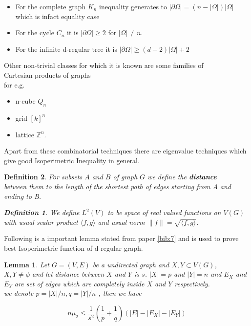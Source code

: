 \documentclass[oneside]{book}
\newtheorem{lemma}[theorem]{Lemma}
\newtheorem{mydef}{Definition}[section]
\begin{document}
	\begin{itemize}
		\item For the complete graph $K_{n}$ inequality generates to $|\partial \Omega|=(n-|\Omega|) | \Omega|$ 
		which is infact equality case
		\item For the cycle $C_{n}$ it is  $|\partial \Omega|\geq 2$ for $|\Omega| \neq n$.
		\item For the infinite d-regular tree it is $|\partial \Omega| \geq(d-2)| \Omega|+2$\par
	\end{itemize}
	


	Other non-trivial classes for which it is known are some families of\\ Cartesian products of graphs \\
	 for e.g. 
	 \begin{itemize}
	 	\item 	n-cube $Q_{n}$
	 	\item 	grid $[k]^{n}$
	    \item   lattice $\mathbb{Z}^{n}$. \\
	
  \end{itemize}
	
	Apart from these combinatorial techniques there are eigenvalue techniques which give good Isoperimetric Inequality in general. \\
	
	 \begin{mydef}
	 	 For subsets $A$ and $B$ of graph $G$ we define the \textbf{distance } \\  between them to the length of the
	 	shortest path of edges starting from  A and ending to B.
	 	\begin{mydef}
	 		We define $L^{2}(V)$ to be space of real valued functions on $V(G)$ with usual scalar product $\langle f, g \rangle $
and usual norm $\|f\| = \sqrt{ \langle f, g \rangle}$.
	 	\end{mydef}
	 \end{mydef}

	 
	 \newpage
Following is a important lemma stated from paper \ref{bib:7} and is used to prove best Isoperimetric function of d-regular graph.
	 	\begin{lemma}
	Let $G=(V,E)$ be a undirected graph and $X,Y \subset V(G)$, \\ 
	$X, Y \neq \phi$ and let distance  between $X$ and $Y$ is $s$. $|X|=p$ and $|Y| =n$	
		and  $E_{X}$  and $E_{Y}$ are set of edges which are completely inside  $X$ and $Y$ respectively. \\
		we  denote $p=|X| / n, q=|Y| / n$ , then we have
		  
		
			\[
		 n\mu_{2}   \leqslant \frac{1}{s^{2}}\left(\frac{1}{p}+\frac{1}{q}\right)\left(  |E| - |E_X|- |E_{Y}| \right)  		\]
			\end{lemma}
		
\end{document}
